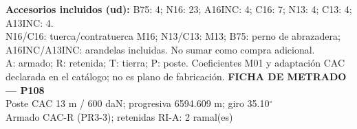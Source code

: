 \begingroup\scriptsize
\textbf{Accesorios incluidos (ud):} B75: 4; N16: 23; A16INC: 4; C16: 7; N13: 4; C13: 4; A13INC: 4.\\
N16/C16: tuerca/contratuerca M16; N13/C13: M13; B75: perno de abrazadera; A16INC/A13INC: arandelas incluidas. No sumar como compra adicional.\\
A: armado; R: retenida; T: tierra; P: poste. Coeficientes M01 y adaptación CAC declarada en el catálogo; no es plano de fabricación.
\endgroup\endgroup
\clearpage{}
\begingroup\small\setlength{\parskip}{3pt}\renewcommand{\arraystretch}{1.05}
\textbf{\large FICHA DE METRADO — P108}\\[4pt]
Poste CAC 13 m / 600 daN; progresiva 6594.609 m; giro 35.10\ensuremath{^\circ}\\
Armado CAC-R (PR3-3); retenidas RI-A: 2 ramal(es)\\
\begingroup\scriptsize
